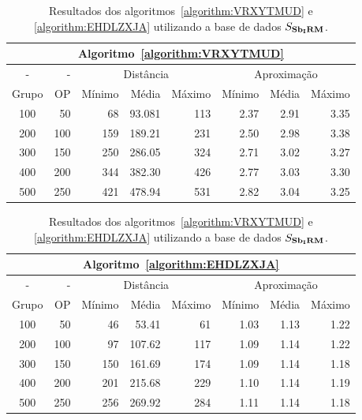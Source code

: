 \begin{table}[!htb]
  \caption{Resultados dos algoritmos~\ref{algorithm:VRXYTMUD} e \ref{algorithm:EHDLZXJA} utilizando a base de dados $S_{\textbf{Sb\textsubscript{I}RM}}{}$.}
  \label{table:HZHMCLUM}
  \centering
  \begin{tabular}{|c|r|r|r|r|r|r|r|}
    \hline
    \multicolumn{8}{|c|}{Algoritmo~\ref{algorithm:VRXYTMUD}}                                                  \\ \hline
      -      &  -   & \multicolumn{3}{c|}{Distância}             & \multicolumn{3}{c|}{Aproximação}           \\ \hline
    Grupo    & OP   & Mínimo       & Média        & Máximo       & Mínimo       & Média        & Máximo       \\ \hline  
    100      & 50   & 68           & 93.081       & 113          & 2.37         & 2.91         & 3.35         \\ \hline
    200      & 100  & 159          & 189.21       & 231          & 2.50         & 2.98         & 3.38         \\ \hline
    300      & 150  & 250          & 286.05       & 324          & 2.71         & 3.02         & 3.27         \\ \hline
    400      & 200  & 344          & 382.30       & 426          & 2.77         & 3.03         & 3.30         \\ \hline
    500      & 250  & 421          & 478.94       & 531          & 2.82         & 3.04         & 3.25         \\ \hline    
  \end{tabular}

  \vspace{5mm}

  \begin{tabular}{|c|r|r|r|r|r|r|r|}
    \hline
    \multicolumn{8}{|c|}{Algoritmo~\ref{algorithm:EHDLZXJA}}                                                  \\ \hline
      -      &  -   & \multicolumn{3}{c|}{Distância}             & \multicolumn{3}{c|}{Aproximação}           \\ \hline
    Grupo    & OP   & Mínimo       & Média        & Máximo       & Mínimo       & Média        & Máximo       \\ \hline  
    100      & 50   & 46           & 53.41        & 61           & 1.03         & 1.13         & 1.22         \\ \hline
    200      & 100  & 97           & 107.62       & 117          & 1.09         & 1.14         & 1.22         \\ \hline
    300      & 150  & 150          & 161.69       & 174          & 1.09         & 1.14         & 1.18         \\ \hline
    400      & 200  & 201          & 215.68       & 229          & 1.10         & 1.14         & 1.19         \\ \hline
    500      & 250  & 256          & 269.92       & 284          & 1.11         & 1.14         & 1.18         \\ \hline    
  \end{tabular}
\end{table}
